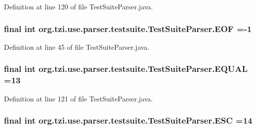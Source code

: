Definition at line 120 of file Test\-Suite\-Parser.\-java.

\hypertarget{classorg_1_1tzi_1_1use_1_1parser_1_1testsuite_1_1_test_suite_parser_a0ebcee9b6b22f1c9c8759e4a3c16f836}{
\subsubsection[{E\-O\-F}]{\setlength{\rightskip}{0pt plus 5cm}final int org.\-tzi.\-use.\-parser.\-testsuite.\-Test\-Suite\-Parser.\-E\-O\-F =-\/1\hspace{0.3cm}{\ttfamily [static]}}}\label{classorg_1_1tzi_1_1use_1_1parser_1_1testsuite_1_1_test_suite_parser_a0ebcee9b6b22f1c9c8759e4a3c16f836}


Definition at line 45 of file Test\-Suite\-Parser.\-java.

\hypertarget{classorg_1_1tzi_1_1use_1_1parser_1_1testsuite_1_1_test_suite_parser_a61cc7de26b739b3e95cbd5c927460c71}{
\subsubsection[{E\-Q\-U\-A\-L}]{\setlength{\rightskip}{0pt plus 5cm}final int org.\-tzi.\-use.\-parser.\-testsuite.\-Test\-Suite\-Parser.\-E\-Q\-U\-A\-L =13\hspace{0.3cm}{\ttfamily [static]}}}\label{classorg_1_1tzi_1_1use_1_1parser_1_1testsuite_1_1_test_suite_parser_a61cc7de26b739b3e95cbd5c927460c71}


Definition at line 121 of file Test\-Suite\-Parser.\-java.

\hypertarget{classorg_1_1tzi_1_1use_1_1parser_1_1testsuite_1_1_test_suite_parser_a8aa7b878269612d3a5ade7bd05f19b29}{
\subsubsection[{E\-S\-C}]{\setlength{\rightskip}{0pt plus 5cm}final int org.\-tzi.\-use.\-parser.\-testsuite.\-Test\-Suite\-Parser.\-E\-S\-C =14\hspace{0.3cm}{\ttfamily [static]}}}\label{classorg_1_1tzi_1_1use_1_1parser_1_1testsuite_1_1_test_suite_parser_a8aa7b878269612d3a5ade7bd05f19b29}


